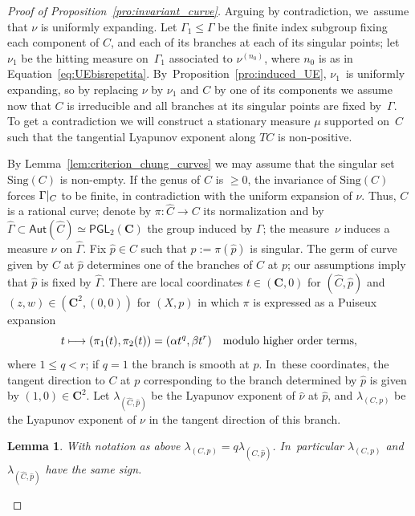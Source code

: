 \documentclass[JEP,XML,SOM,Unicode,published]{cedram}
\newcommand\mto{\mathchoice{\longmapsto}{\mapsto}{\mapsto}{\mapsto}}
\newcommand{\rest}[1]{ \arrowvert_{#1}}
\def\C{\mathbf{C}}
\newcommand{\Sing}{{\mathrm{Sing}}}
\newcommand\Aut{\mathsf{Aut}}
\newcommand\PGL{{\mathsf{PGL}}}
\theoremstyle{plain}
\newtheorem{lem}[thm]{Lemma}
\theoremstyle{definition}
\begin{document}
\begin{proof}[Proof of Proposition~\ref{pro:invariant_curve}]
Arguing by contradiction, we~assume that $\nu$ is uniformly expanding. Let $\Gamma_1\leq \Gamma$
be the finite index subgroup fixing each component of $C$,
and each of its branches at each of its singular points; let $\nu_1$ be
the hitting measure on~$\Gamma_1$ associated to
$\nu^{(n_0)}$, where $n_0$ is as in Equation~\eqref{eq:UEbisrepetita}. By~Proposition~\ref{pro:induced_UE}, $\nu_1$~is uniformly
expanding, so by replacing $\nu$ by $\nu_1$ and $C$ by one of its components
we assume now that $C$ is irreducible and all branches at its
singular points are fixed by~$\Gamma$. To get a
contradiction we will construct a stationary measure $\mu$ supported on~$C$
such that the tangential Lyapunov exponent along $TC$ is non-positive.

By Lemma~\ref{lem:criterion_chung_curves} we may assume that
the singular set $\Sing(C)$ is non-empty.
If the genus of $C$ is $\geq 0$, the invariance of $\Sing(C)$ forces $\Gamma\rest{C}$ to be finite, in contradiction with the
uniform expansion of $\nu$. Thus, $C$ is a rational curve;
denote by $\pi:\hat C\to C$ its normalization and by $\hat \Gamma\subset \Aut(\hat{C})\simeq \PGL_2(\C)$
the group induced by $\Gamma$; the measure~$\nu$ induces a
measure $\hat \nu$ on $\hat \Gamma$.
Fix $\hat p\in \hat C$ such that $p:=\pi(\hat p)$ is singular. The germ of curve given by $\hat C$ at $\hat p$ determines one of the branches of $C$ at $p$; our assumptions imply that
$\hat p$ is fixed by $\hat\Gamma$. There are local coordinates $t\in (\C,0)$ for $(\hat C, \hat p)$ and $(z,w)\in (\C^2, (0,0))$ for $(X, p)$ in which
$\pi$ is expressed as a Puiseux expansion
\begin{equation*}
t\mto (\pi_1(t), \pi_2(t)) = (\alpha t^q , \beta t^r) \quad\text{modulo higher order terms},
\end{equation*}
where $1\leq q<r$; if $q=1$ the branch is smooth at $p$. In~these coordinates, the tangent direction to $C$ at $p$ corresponding to the branch determined by $\hat p$ is
given by $(1,0)\in \C^2$.
Let $\lambda_{(\hat C, \hat{p})}$ be the
Lyapunov exponent of $\hat \nu$ at $\hat p$, and $\lambda_{(C, p)}$ be the Lyapunov exponent of $\nu$
in the tangent direction of this branch.

\begin{lem}\label{lem:tangent_singular}
With notation as above
$\lambda_{(C, p)} = q \lambda_{(\hat C, \hat{p})}$. In~particular $\lambda_{(C, p)}$ and $\lambda_{(\hat C, \hat{p})}$
have the same sign.
\end{lem}


\end{proof}
\end{document}
